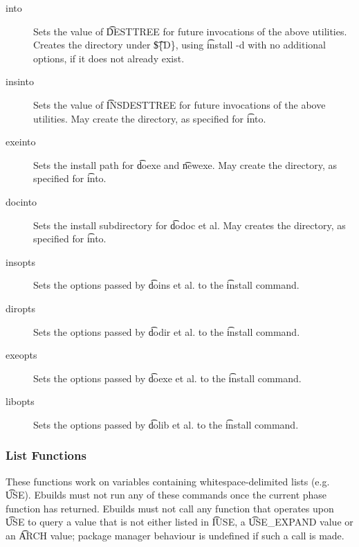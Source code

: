 \begin{description}

\item[into] Sets the value of \t{DESTTREE} for future invocations of the above utilities.  Creates
the directory under \t{\$\{D\}}, using \t{install -d} with no additional options, if it does not
already exist.

\item[insinto] Sets the value of \t{INSDESTTREE} for future invocations of the above utilities. May
    create the directory, as specified for \t{into}.

\item[exeinto] Sets the install path for \t{doexe} and \t{newexe}. May create the directory, as specified
    for \t{into}.

\item[docinto] Sets the install subdirectory for \t{dodoc} et al. May creates the directory, as specified
    for \t{into}.

\item[insopts] Sets the options passed by \t{doins} et al. to the \t{install} command.

\item[diropts] Sets the options passed by \t{dodir} et al. to the \t{install} command.

\item[exeopts] Sets the options passed by \t{doexe} et al. to the \t{install} command.

\item[libopts] Sets the options passed by \t{dolib} et al. to the \t{install} command.

\end{description}

\subsubsection{List Functions}
These functions work on variables containing whitespace-delimited lists (e.g. \t{USE}). Ebuilds must
not run any of these commands once the current phase function has returned. Ebuilds must not call
any function that operates upon \t{USE} to query a value that is not either listed in \t{IUSE}, a
\t{USE\_EXPAND} value or an \t{ARCH} value; package manager behaviour is undefined if such a call
is made.

